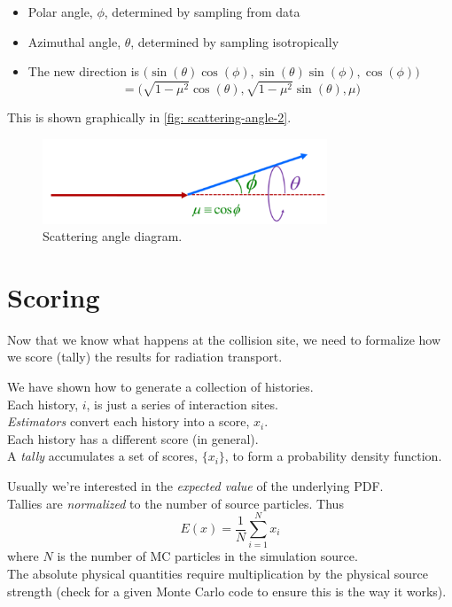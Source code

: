 \documentclass[12pt]{article}
\begin{document}
\begin{itemize}
    \item Polar angle, $\phi$, determined by sampling from data
\vspace*{0.5em}
    \item Azimuthal angle, $\theta$, determined by sampling isotropically
    \vspace*{0.5em}
    \item The new direction is $\bigl(\sin(\theta) \cos(\phi), \sin(\theta) \sin(\phi), \cos(\phi)\bigr)$ \[= \bigl(\sqrt{1 - \mu^2} \cos(\theta),  \sqrt{1 - \mu^2} \sin(\theta), \mu \bigr)\]
\end{itemize}

This is shown graphically in \autoref{fig: scattering-angle-2}.

\begin{figure}[h!]
\begin{center}
  \includegraphics[height=1in,clip]{../figs/scattering-angle-2.png}
  \caption{Scattering angle diagram.}
  \label{fig: scattering-angle-2}
\end{center}
\end{figure}


\section*{Scoring}

Now that we know what happens at the collision site, we need to formalize how we score (tally) the results for radiation transport.

We have shown how to generate a collection of histories.\\
Each history, $i$, is just a series of interaction sites.\\
\textit{Estimators} convert each history into a score, $x_i$. \\
Each history has a different score (in general).\\
A \textit{tally} accumulates a set of scores, $\{x_i\}$, to form a probability density function.

Usually we're interested in the \textit{expected value} of the underlying PDF. \\
Tallies are \textit{normalized} to the number of source particles. Thus
\[
E(x) = \frac{1}{N} \sum_{i=1}^N x_i
\]
where $N$ is the number of MC particles in the simulation source.\\
The absolute physical quantities require multiplication by the physical source strength (check for a given Monte Carlo code to ensure this is the way it works). 
\end{document}
